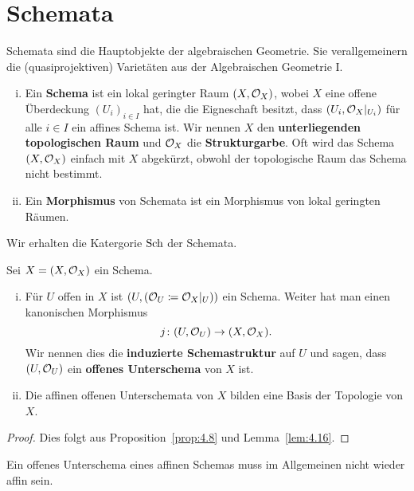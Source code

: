 
\chapter{Schemata}

Schemata sind die Hauptobjekte der algebraischen Geometrie. Sie verallgemeinern die (quasiprojektiven) Varietäten aus der Algebraischen Geometrie I.

\begin{defn}
\label{defn:5.1}
	\begin{enumerate}[i)]
		\item Ein \textbf{Schema} ist ein lokal geringter Raum $(X,\mathcal{O}_X)$, wobei $X$ eine offene Überdeckung $(U_i)_{i\in I}$ hat, die die Eigneschaft besitzt, dass $(U_i,\mathcal{O}_{X}\vert_{U_i})$ für alle $i \in I$ ein affines Schema ist. Wir nennen $X$ den \textbf{unterliegenden topologischen Raum} und $\mathcal{O}_X$ die \textbf{Strukturgarbe}. Oft wird das Schema $(X,\mathcal{O}_X)$ einfach mit $X$ abgekürzt, obwohl der topologische Raum das Schema nicht bestimmt.
		\item Ein \textbf{Morphismus} von Schemata ist ein Morphismus von lokal geringten Räumen.
	\end{enumerate}
	Wir erhalten die Katergorie $\operatorname{Sch}$ der Schemata.
\end{defn}

\begin{prop}
	Sei $X = (X,\mathcal{O}_X)$ ein Schema.
	\begin{enumerate}[i)]
		\item Für $U$ offen in $X$ ist $(U,(\mathcal{O}_U \coloneqq \mathcal{O}_X\vert_U))$ ein Schema. Weiter hat man einen kanonischen Morphismus
		\[
			j\colon (U,\mathcal{O}_U) \to (X,\mathcal{O}_X).
		\]
		Wir nennen dies die \textbf{induzierte Schemastruktur} auf $U$ und sagen, dass $(U,\mathcal{O}_U)$ ein \textbf{offenes Unterschema} von $X$ ist.
		\item Die affinen offenen Unterschemata von $X$ bilden eine Basis der Topologie von $X$.
	\end{enumerate}
	\begin{proof}
		Dies folgt aus Proposition~\ref{prop:4.8} und Lemma~\ref{lem:4.16}.
	\end{proof}
\end{prop}

\begin{bem}
	Ein offenes Unterschema eines affinen Schemas muss im Allgemeinen nicht wieder affin sein.
\end{bem}

